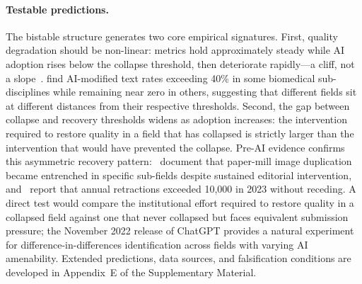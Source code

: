\documentclass{article}
\begin{document}
\paragraph{Testable predictions.}
The bistable structure generates two core empirical signatures.
First, quality degradation should be non-linear: metrics hold approximately steady while AI adoption rises below the collapse threshold, then deteriorate rapidly---a cliff, not a slope~\citep{Scheffer2009}.
\citet{Kobak2025} find AI-modified text rates exceeding 40\% in some biomedical sub-disciplines while remaining near zero in others, suggesting that different fields sit at different distances from their respective thresholds.
Second, the gap between collapse and recovery thresholds widens as adoption increases: the intervention required to restore quality in a field that has collapsed is strictly larger than the intervention that would have prevented the collapse.
Pre-AI evidence confirms this asymmetric recovery pattern:~\citet{Bik2016} document that paper-mill image duplication became entrenched in specific sub-fields despite sustained editorial intervention, and~\citet{VanNoorden2023} report that annual retractions exceeded 10{,}000 in 2023 without receding.
A direct test would compare the institutional effort required to restore quality in a collapsed field against one that never collapsed but faces equivalent submission pressure; the November 2022 release of ChatGPT provides a natural experiment for difference-in-differences identification across fields with varying AI amenability.
Extended predictions, data sources, and falsification conditions are developed in Appendix~E of the Supplementary Material.
\end{document}
